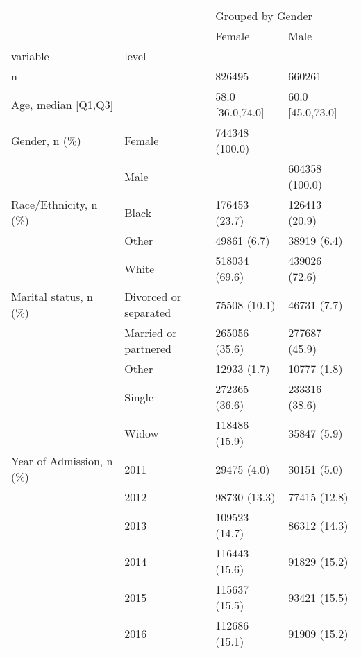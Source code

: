 \begin{tabular}{llll}
\toprule
                                       &   & \multicolumn{2}{l}{Grouped by Gender} \\
                                       &   &             Female &               Male \\
variable & level &                    &                    \\
\midrule
n &   &             826495 &             660261 \\
Age, median [Q1,Q3] &   &   58.0 [36.0,74.0] &   60.0 [45.0,73.0] \\
Gender, n (\%) & Female &     744348 (100.0) &                    \\
                                       & Male &                    &     604358 (100.0) \\
Race/Ethnicity, n (\%) & Black &      176453 (23.7) &      126413 (20.9) \\
                                       & Other &        49861 (6.7) &        38919 (6.4) \\
                                       & White &      518034 (69.6) &      439026 (72.6) \\
Marital status, n (\%) & Divorced or separated &       75508 (10.1) &        46731 (7.7) \\
                                       & Married or partnered &      265056 (35.6) &      277687 (45.9) \\
                                       & Other &        12933 (1.7) &        10777 (1.8) \\
                                       & Single &      272365 (36.6) &      233316 (38.6) \\
                                       & Widow &      118486 (15.9) &        35847 (5.9) \\
Year of Admission, n (\%) & 2011 &        29475 (4.0) &        30151 (5.0) \\
                                       & 2012 &       98730 (13.3) &       77415 (12.8) \\
                                       & 2013 &      109523 (14.7) &       86312 (14.3) \\
                                       & 2014 &      116443 (15.6) &       91829 (15.2) \\
                                       & 2015 &      115637 (15.5) &       93421 (15.5) \\
                                       & 2016 &      112686 (15.1) &       91909 (15.2) \\

\end{tabular}
